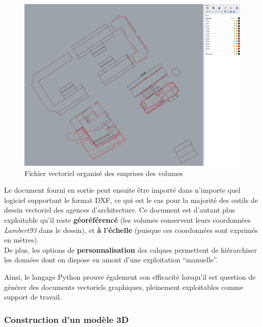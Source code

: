 \documentclass[
  11pt,
  french,
]{article}
\begin{document}
\begin{tcolorbox}
\begin{figure}

{\centering \includegraphics[width=0.9\linewidth]{__imgs/cad_1} 

}

\caption[Fichier vectoriel organisé des emprises des volumes  -  Réalisation personnelle]{Fichier vectoriel organisé des emprises des volumes}\label{fig:dessin_cad}
\end{figure}
\end{tcolorbox}

Le document fourni en sortie peut ensuite être importé dans n'importe
quel logiciel supportant le format DXF, ce qui est le cas pour la
majorité des outils de dessin vectoriel des agences d'architecture. Ce
document est d'autant plus exploitable qu'il reste \textbf{géoréférencé}
(les volumes conservent leurs coordonnées \emph{Lambert93} dans le
dessin), et \textbf{à l'échelle} (puisque ces coordonnées sont exprimés
en mètres).\\
De plus, les options de \textbf{personnalisation} des calques permettent
de hiérarchiser les données dont on dispose en amont d'une exploitation
``manuelle''.

Ainsi, le langage Python prouve également son efficacité lorsqu'il est
question de générer des documents vectoriels graphiques, pleinement
exploitables comme support de travail.

\hypertarget{construction-dun-moduxe8le-3d}{%
\subsubsection{Construction d'un modèle
3D}\label{construction-dun-moduxe8le-3d}}
\end{document}
